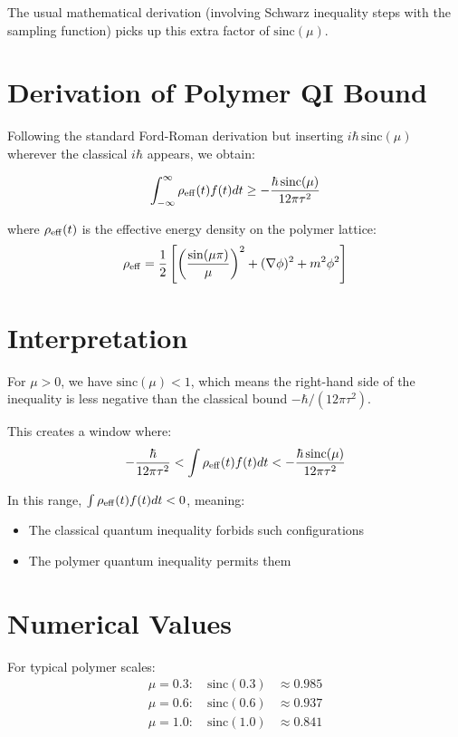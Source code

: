 \documentclass[11pt]{article}
\begin{document}
The usual mathematical derivation (involving Schwarz inequality steps with the sampling function) picks up this extra factor of $\mathrm{sinc}(\mu)$.

\section{Derivation of Polymer QI Bound}

Following the standard Ford-Roman derivation but inserting $i\hbar\,\mathrm{sinc}(\mu)$ wherever the classical $i\hbar$ appears, we obtain:

\begin{equation}
\int_{-\infty}^{\infty} \rho_{\rm eff}(t) f(t) dt \geq -\frac{\hbar\,\mathrm{sinc}(\mu)}{12\pi\tau^2}
\end{equation}

where $\rho_{\rm eff}(t)$ is the effective energy density on the polymer lattice:
\begin{equation}
\rho_{\rm eff} = \frac{1}{2}\left[\left(\frac{\sin(\mu\pi)}{\mu}\right)^2 + (\nabla\phi)^2 + m^2\phi^2\right]
\end{equation}

\section{Interpretation}

For $\mu > 0$, we have $\mathrm{sinc}(\mu) < 1$, which means the right-hand side of the inequality is less negative than the classical bound $-\hbar/(12\pi\tau^2)$.

This creates a window where:
\begin{equation}
-\frac{\hbar}{12\pi\tau^2} < \int \rho_{\rm eff}(t) f(t) dt < -\frac{\hbar\,\mathrm{sinc}(\mu)}{12\pi\tau^2}
\end{equation}

In this range, $\int \rho_{\rm eff}(t) f(t) dt < 0$, meaning:
\begin{itemize}
\item The classical quantum inequality forbids such configurations
\item The polymer quantum inequality permits them
\end{itemize}

\section{Numerical Values}

For typical polymer scales:
\begin{align}
\mu = 0.3: \quad \mathrm{sinc}(0.3) &\approx 0.985 \\
\mu = 0.6: \quad \mathrm{sinc}(0.6) &\approx 0.937 \\
\mu = 1.0: \quad \mathrm{sinc}(1.0) &\approx 0.841
\end{align}
\end{document}
